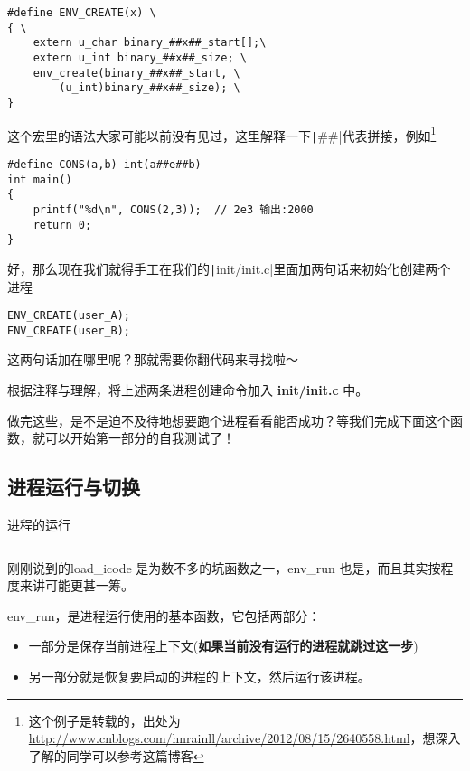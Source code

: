 \begin{verbatim}
#define ENV_CREATE(x) \
{ \
    extern u_char binary_##x##_start[];\
    extern u_int binary_##x##_size; \
    env_create(binary_##x##_start, \
        (u_int)binary_##x##_size); \
}
\end{verbatim}

这个宏里的语法大家可能以前没有见过，这里解释一下\texttt|##|代表拼接，例如\footnote{这个例子是转载的，出处为\url{http://www.cnblogs.com/hnrainll/archive/2012/08/15/2640558.html}，想深入了解的同学可以参考这篇博客}

\begin{verbatim}
#define CONS(a,b) int(a##e##b) 
int main() 
{
    printf("%d\n", CONS(2,3));  // 2e3 输出:2000 
    return 0; 
}
\end{verbatim}

好，那么现在我们就得手工在我们的\texttt|init/init.c|里面加两句话来初始化创建两个进程

\begin{verbatim}
ENV_CREATE(user_A);
ENV_CREATE(user_B);
\end{verbatim}

这两句话加在哪里呢？那就需要你翻代码来寻找啦～

\begin{exercise}
根据注释与理解，将上述两条进程创建命令加入 \textbf{init/init.c} 中。
\end{exercise}

做完这些，是不是迫不及待地想要跑个进程看看能否成功？等我们完成下面这个函数，就可以开始第一部分的自我测试了！

\subsection{进程运行与切换}

\begin{codeBoxWithCaption}{进程的运行\label{code:env_run.c}}
  \inputminted[linenos]{c}{codes/env_run.c}
\end{codeBoxWithCaption}

刚刚说到的load\_icode 是为数不多的坑函数之一，env\_run 也是，而且其实按程度来讲可能更甚一筹。

env\_run，是进程运行使用的基本函数，它包括两部分：
\begin{itemize}
  \item 一部分是保存当前进程上下文(\textbf{如果当前没有运行的进程就跳过这一步})
  \item 另一部分就是恢复要启动的进程的上下文，然后运行该进程。
\end{itemize}


